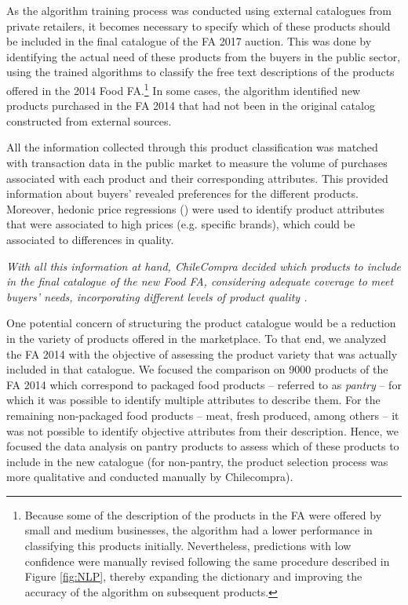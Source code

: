 


As the algorithm training process was conducted using external catalogues from private retailers, it becomes necessary to specify which of these products should be included in the final catalogue of the FA 2017 auction. This was done by identifying the actual need of these products from the buyers in the public sector, using the trained algorithms to classify the free text descriptions of the products offered in the 2014 Food FA.\footnote{Because some of the description of the products in the FA were offered by small and medium businesses, the algorithm had a lower performance in classifying this products initially. Nevertheless, predictions with low confidence were manually revised following the same procedure described in Figure \ref{fig:NLP}, thereby expanding the dictionary and improving the accuracy of the algorithm on subsequent products.}  In some cases, the algorithm identified new products purchased in the FA 2014 that had not been in the original catalog constructed from external sources.

All the information collected through this product classification was matched with transaction data in the public market to measure the volume of purchases associated with each product and their corresponding attributes. {This provided information about buyers' revealed preferences for the different products.} Moreover, hedonic price regressions (\cite{rosen1974hedonic,greenstone2017continuing}) were used to identify product attributes that were associated to high prices (e.g. specific brands), which could be associated to differences in quality. 

\textit{With all this information at hand, ChileCompra decided which products to include in the final catalogue of the new Food FA, considering adequate coverage to meet buyers' needs, incorporating different levels of product quality .}

{One potential concern of structuring the product catalogue would be a reduction in the variety of products offered in the marketplace. To that end, we analyzed the FA 2014 with the objective of assessing the product variety that was actually included in that catalogue. We focused the comparison on 9000 products of the FA 2014 which correspond to packaged food products -- referred to as \textit{pantry} -- for which it was possible to identify multiple attributes to describe them. For the remaining non-packaged food products -- meat, fresh produced, among others -- it was not possible to identify objective attributes from their description. Hence, we focused the data analysis on pantry products to assess which of these products to include in the new catalogue (for non-pantry, the product selection process was more qualitative and conducted manually by Chilecompra).}

